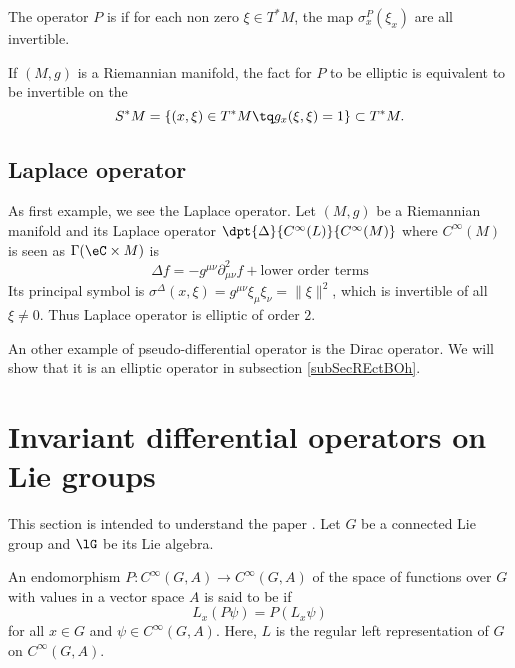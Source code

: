 \begin{definition}  \label{DefGLpDEHy}
    The operator $P$ is  if for each non zero $\xi\in T^*M$, the map $\sigma_x^P(\xi_x)$ are all invertible.
\end{definition}

If $(M,g)$ is a Riemannian manifold, the fact for $P$ to be elliptic is equivalent to be invertible on the 
\[ 
  S^*M=\{ (x,\xi)\in T^*M\tq g_x(\xi,\xi)=1 \}\subset T^*M.
\]

\subsection{Laplace operator}

As first example, we see the Laplace operator. Let $(M,g)$ be a Riemannian manifold and its Laplace operator $\dpt{ \Delta }{  C^{\infty}(L) }{  C^{\infty}(M) }$ where $ C^{\infty}(M)$ is seen as $\Gamma(\eC\times M)$ is
\[ 
  \Delta f=-g^{\mu\nu}\partial^2_{\mu\nu}f+\text{lower order terms}
\]
Its principal symbol is $\sigma^{\Delta}(x,\xi)=g^{\mu\nu}\xi_{\mu}\xi_{\nu}=\| \xi \|^2$, which is invertible of all $\xi\neq 0$. Thus Laplace operator is elliptic of order $2$.

An other example of pseudo-differential operator is the Dirac operator. We will show that it is an elliptic operator in subsection \ref{subSecREctBOh}.

\section{Invariant differential operators on Lie groups}

This section is intended to understand the paper \cite{QuantifKhalerian}. Let $G$ be a connected Lie group and $\lG$ be its Lie algebra.

An endomorphism $P\colon C^{\infty}(G,A)\to  C^{\infty}(G,A)$ of the space of functions over $G$ with values in a vector space $A$ is said to be  if
\begin{equation}  \label{EqDefLxinvarop}
	L_{x}(P\psi)=P(L_{x}\psi)
\end{equation}
for all $x\in G$ and $\psi\in C^{\infty}(G,A)$. Here, $L$ is the regular left representation of $G$ on $ C^{\infty}(G,A)$. 

